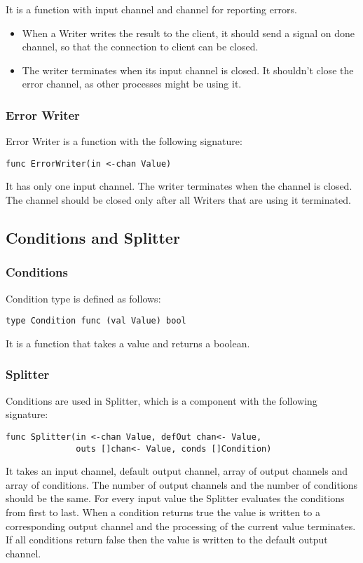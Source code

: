 \documentclass[12pt,a4paper]{article}
\begin{document}
It is a function with input channel and channel for reporting errors.
\begin{itemize}
	\item When a Writer writes the result to the client, it should send a signal
				on done channel, so that the connection to client can be closed.
	\item The writer terminates when its input channel is closed. It shouldn't
			  close the error channel, as other processes might be using it.
\end{itemize}

\subsubsection{Error Writer}
Error Writer is a function with the following signature:

\begin{lstlisting}
func ErrorWriter(in <-chan Value)
\end{lstlisting}
It has only one input channel. The writer terminates when the channel
is closed. The channel should be closed only after all Writers that 
are using it terminated.

\subsection{Conditions and Splitter}
\subsubsection{Conditions}
Condition type is defined as follows:

\begin{lstlisting}
type Condition func (val Value) bool
\end{lstlisting}
It is a function that takes a value and returns a boolean.

\subsubsection{Splitter}
Conditions are used in Splitter, which is a component with the 
following signature:

\begin{lstlisting}
func Splitter(in <-chan Value, defOut chan<- Value, 
			  outs []chan<- Value, conds []Condition)
\end{lstlisting}
It takes an input channel, default output channel, array of output channels and array of conditions.
The number of output channels and the number of conditions should be the same.
For every input value the Splitter evaluates the conditions from first to last.
When a condition returns true the value is written to a corresponding output channel 
and the processing of the current value terminates. If all conditions return false
then the value is written to the default output channel.
\end{document}
